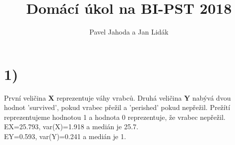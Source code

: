 \documentclass[12pt,a4paper]{article}
\begin{document}
\title{\LARGE \bf Domácí úkol na BI-PST 2018}
 \author{Pavel Jahoda a Jan Lidák}

\maketitle

\section{1)}
První veličina {\bf X} reprezentuje váhy vrabců. Druhá veličina {\bf Y} nabývá dvou hodnot 'survived', pokud vrabec přežil a 'perished' pokud nepřežil. Prežítí reprezentujeme hodnotou 1 a hodnota 0 reprezentuje, že vrabec nepřežil.\\
EX=25.793, var(X)=1.918 a medián je 25.7.\\
EY=0.593, var(Y)=0.241 a medián je 1.
\par \bigskip
\end{document}
